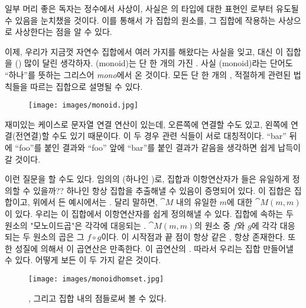 일부 머리 좋은 독자는 정수에서 \trAdder{} 사상이, 사실은 의 타입에 대한 표현인 로부터 유도될 수 있음을 눈치챘을 것이다.
이를 통해서 가 \trMonoid 집합의 원소를, 그 집합에 작용하는 사상으로 사상한다는 점을 알 수 있다.

이제, 우리가 지금껏 자연수 집합에서 여러 가지를 해왔다는 사실을 잊고, 대신 이 집합을 \trMorphism\이(\trAdder\가) 많이 달린 \trObject{} 생각하자.
\trMonoid(monoid)는 단 한 개의 \trObject\를 가진 . 사실 \trMonoid(monoid)라는 단어도 ``하나''를 뜻하는 그리스어 \emph{mono}에서 온 것이다.
모든 \trMonoid\는 단 한 개의 \trObject\와, 적절하게  관련된 법칙들을 따르는  집합으로 설명될 수 있다.

\begin{figure}[H]
\centering
\texttt{[image: images/monoid.jpg]}
\end{figure}

\noindent
재미있는 케이스로 문자열 연결 연산이 있는데, 오른쪽에 연결할 수도 있고, 왼쪽에 연결(전연결)할 수도 있기 때문이다.
이 두 경우 \trComposition 관련 식들이 서로 대칭적이다.
``bar'' 뒤에 ``foo''를 붙인 결과와 ``foo'' 앞에 ``bar''를 붙인 결과가 같음을 생각하면 쉽게 납득이 갈 것이다.

이런 질문을 할 수도 있다. 임의의  \trMonoid(\trObject\가 하나인 \trCategory)로, 집합과 이항연산자가 들은 \trMonoid\를 유일하게 정의할 수 있을까??
\trObject\가 하나인  항상 집합을 추출해낼 수 있음이 증명되어 있다. 이 집합은  집합이고, 위에서 든 예시에서는 .
달리 말하면, \trCategory $\cat{M}$ 내의 유일한 \trObject $m$에 대한 \trHomSet $\cat{M}(m, m)$이 있다. 
우리는 이 집합에서 이항연산자를 쉽게 정의해낼 수 있다. 집합에 속하는 두 원소의 "모노이드곱"은 각각에 대응되는  \trComposition{}.
$\cat{M}(m, m)$의 원소 중 $f$와 $g$에 각각 대응되는 두 원소의 곱은 그  $f \circ g$이다.
이  시작점과 끝 점이 항상 같은 , \trComposition\은 항상 존재한다. %
또한  성질에 의해서 이 곱연산은 \trAssociativity\를 만족한다. \trIdentityMorphism\이 이 곱연산의 . 
따라서 우리는 \trCategory\trMonoid{} 집합 \trMonoid\를 만들어낼 수 있다. 어떻게 보든 이 두 가지 \trMonoid\는 같은 것이다.

\begin{figure}[H]
\centering
\texttt{[image: images/monoidhomset.jpg]}
\caption{\trMorphism{}, 그리고 집합 내의 점들로써 \trMonoid\trHomSet\을 볼 수 있다.}
\end{figure}

